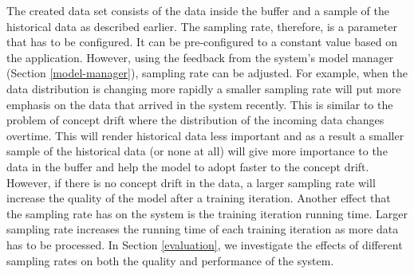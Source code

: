 \documentclass{vldb}
\begin{document}
The created data set consists of the data inside the buffer and a sample of the historical data as described earlier.
The sampling rate, therefore, is a parameter that has to be configured.
It can be pre-configured to a constant value based on the application.
However, using the feedback from the system's model manager (Section \ref{model-manager}), sampling rate can be adjusted.
For example, when the data distribution is changing more rapidly a smaller sampling rate will put more emphasis on the data that arrived in the system recently. 
This is similar to the problem of concept drift where the distribution of the incoming data changes overtime.
This will render historical data less important and as a result a smaller sample of the historical data (or none at all) will give more importance to the data in the buffer and help the model to adopt faster to the concept drift.
However, if there is no concept drift in the data, a larger sampling rate will increase the quality of the model after a training iteration.
Another effect that the sampling rate has on the system is the training iteration running time.
Larger sampling rate increases the running time of each training iteration as more data has to be processed.
In Section \ref{evaluation}, we investigate the effects of different sampling rates on both the quality and performance of the system.
\end{document}
